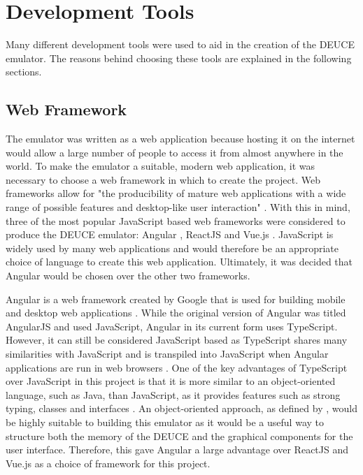 \documentclass{l4proj}
\begin{document}
\section{Development Tools}
Many different development tools were used to aid in the creation of the DEUCE emulator. The reasons behind choosing these tools are explained in the following sections.

\subsection{Web Framework}
The emulator was written as a web application because hosting it on the internet would allow a large number of people to access it from almost anywhere in the world. To make the emulator a suitable, modern web application, it was necessary to choose a web framework in which to create the project. Web frameworks allow for "the producibility of mature web applications with a wide range of possible features and desktop-like user interaction" \citep{kersten10}. With this in mind, three of the most popular JavaScript based web frameworks were considered to produce the DEUCE emulator: Angular \citep{angular19}, ReactJS \citep{react19} and Vue.js \citep{vue19}. JavaScript is widely used by many web applications \citep{javascript15} and would therefore be an appropriate choice of language to create this web application. Ultimately, it was decided that Angular would be chosen over the other two frameworks.

Angular is a web framework created by Google that is used for building mobile and desktop web applications \citep{angular19}. While the original version of Angular was titled AngularJS and used JavaScript, Angular in its current form uses TypeScript. However, it can still be considered JavaScript based as TypeScript shares many similarities with JavaScript and is transpiled into JavaScript when Angular applications are run in web browsers \citep{Clow18}. One of the key advantages of TypeScript over JavaScript in this project is that it is more similar to an object-oriented language, such as Java, than JavaScript, as it provides features such as strong typing, classes and interfaces \citep{typescript18}. An object-oriented approach, as defined by \citet{chambers14}, would be highly suitable to building this emulator as it would be a useful way to structure both the memory of the DEUCE and the graphical components for the user interface. Therefore, this gave Angular a large advantage over ReactJS and Vue.js as a choice of framework for this project.
\end{document}
